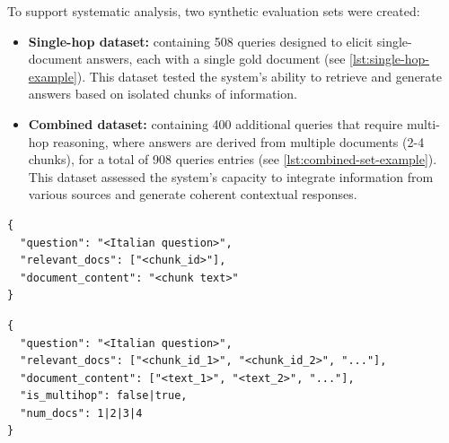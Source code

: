 \begin{spacing}{1.5}
\noindent To support systematic analysis, two synthetic evaluation sets were created:
\begin{itemize}
      \item \textbf{Single-hop dataset:} containing 508 queries designed to elicit single-document answers, each with a single gold document (see \autoref{lst:single-hop-example}). This dataset tested the system's ability to retrieve and generate answers based on isolated chunks of information.
      \item \textbf{Combined dataset:} containing 400 additional queries that require multi-hop reasoning, where answers are derived from multiple documents (2-4 chunks), for a total of 908 queries entries (see \autoref{lst:combined-set-example}). This dataset assessed the system's capacity to integrate information from various sources and generate coherent contextual responses.
\end{itemize}


\begin{lstlisting}[frame=none,
                   caption={JSON output format for single-hop dataset items.},
                   captionpos=b,
                   label={lst:single-hop-example},
  xleftmargin=0.2\textwidth,
  xrightmargin=0.2\textwidth,
  basicstyle=\fontsize{9}{10.5}\selectfont\ttfamily]
{
  "question": "<Italian question>",
  "relevant_docs": ["<chunk_id>"],
  "document_content": "<chunk text>"
}
\end{lstlisting}

\vspace{0.6em}

\begin{lstlisting}[frame=none,
                   caption={JSON output format for combined dataset items, including single-hop and multi-hop questions.},
                   captionpos=b,
                   label={lst:combined-set-example},
  xleftmargin=0.2\textwidth,
  xrightmargin=0.2\textwidth,
  basicstyle=\fontsize{9}{10.5}\selectfont\ttfamily]
{
  "question": "<Italian question>",
  "relevant_docs": ["<chunk_id_1>", "<chunk_id_2>", "..."],
  "document_content": ["<text_1>", "<text_2>", "..."],
  "is_multihop": false|true,
  "num_docs": 1|2|3|4
}
\end{lstlisting}
\vspace{0.6em}


\end{spacing}
